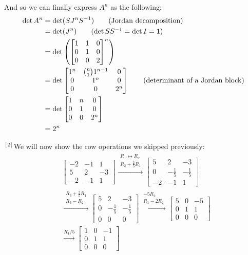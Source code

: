 \documentclass{article}
\begin{document}
And so we can finally express $A^n$ as the following:
\begin{align*}
  \operatorname{det}A^n&=\operatorname{det}(SJ^nS^{-1})\tag{Jordan decomposition}\\
  &=\operatorname{det}(J^n)\tag{$\operatorname{det}SS^{-1}=\operatorname{det}I=1$}\\
  &=\operatorname{det}\left(\begin{bmatrix}
    1&1&0\\0&1&0\\0&0&2
  \end{bmatrix}^n\right)\\
  &=\operatorname{det}\begin{bmatrix}
    1^n&\binom{n}{1}1^{n-1}&0\\0&1^n&0\\0&0&2^n
  \end{bmatrix}\tag{determinant of a Jordan block}\\
  &=\operatorname{det}\begin{bmatrix}
    1&n&0\\0&1&0\\0&0&2^n
  \end{bmatrix}\\
  &=2^n
\end{align*}

$\phantom{}^{[2]}$We will now show the row operations we skipped previously:
\begin{align*} 
  &\left[\begin{array}{rrr}
    -2&-1&1\\5&2&-3\\-2&-1&1
    \end{array} \right]
    \xrightarrow{\substack{R_1\leftrightarrow R_2\\R_2+\frac{2}{5}R_1}} 
    \left[\begin{array}{rrr}
      5&2&-3\\
      0&-\frac{1}{5}&-\frac{1}{5}\\
      -2&-1&1
    \end{array} \right]\\
    &\xrightarrow{\substack{R_3+\frac{2}{5}R_1\\ R_3-R_2}} 
    \left[\begin{array}{rrr}
      5&2&-3\\
      0&-\frac{1}{5}&-\frac{1}{5}\\
      0&0&0
    \end{array} \right]
    \xrightarrow{\substack{-5R_2\\ R_1-2R_2}}
    \left[\begin{array}{rrr} 
      5&0&-5\\
      0&1&1\\
      0&0&0
    \end{array} \right]\\
    &\xrightarrow{R_1/5}
    \left[\begin{array}{rrr} 
      1&0&-1\\
      0&1&1\\
      0&0&0
    \end{array} \right]
\end{align*}
\end{document}
